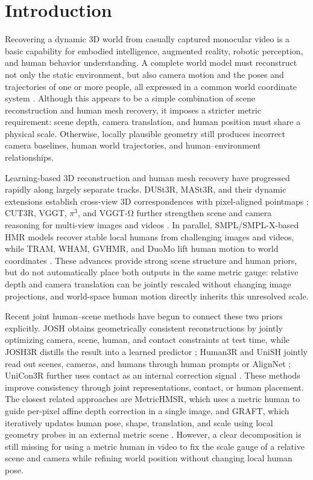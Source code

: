 \documentclass{article}
\begin{document}
\section{Introduction}\label{sec:introduction}

Recovering a dynamic 3D world from casually captured monocular video is a basic capability for embodied intelligence, augmented reality, robotic perception, and human behavior understanding. A complete world model must reconstruct not only the static environment, but also camera motion and the poses and trajectories of one or more people, all expressed in a common world coordinate system \citep{chen2026human3r,li2026unish,liu2026josh}. Although this appears to be a simple combination of scene reconstruction and human mesh recovery, it imposes a stricter metric requirement: scene depth, camera translation, and human position must share a physical scale. Otherwise, locally plausible geometry still produces incorrect camera baselines, human world trajectories, and human--environment relationships.

Learning-based 3D reconstruction and human mesh recovery have progressed rapidly along largely separate tracks. DUSt3R, MASt3R, and their dynamic extensions establish cross-view 3D correspondences with pixel-aligned pointmaps \citep{wang2024dust3r,leroy2024mast3r,zhang2024monst3r}; CUT3R, VGGT, $\pi^3$, and VGGT-Ω further strengthen scene and camera reasoning for multi-view images and videos \citep{wang2025cut3r,wang2025vggt,wang2025pi3,wang2026vggtomega}. In parallel, SMPL/SMPL-X-based HMR models recover stable local humans from challenging images and videos, while TRAM, WHAM, GVHMR, and DuoMo lift human motion to world coordinates \citep{wang2024tram,shin2024wham,shen2024gvhmr,wang2026duomo}. These advances provide strong scene structure and human priors, but do not automatically place both outputs in the same metric gauge: relative depth and camera translation can be jointly rescaled without changing image projections, and world-space human motion directly inherits this unresolved scale.

Recent joint human--scene methods have begun to connect these two priors explicitly. JOSH obtains geometrically consistent reconstructions by jointly optimizing camera, scene, human, and contact constraints at test time, while JOSH3R distills the result into a learned predictor \citep{liu2026josh}; Human3R and UniSH jointly read out scenes, cameras, and humans through human prompts or AlignNet \citep{chen2026human3r,li2026unish}; UniCon3R further uses contact as an internal correction signal \citep{sur2026unicon3r}. These methods improve consistency through joint representations, contact, or human placement. The closest related approaches are MetricHMSR, which uses a metric human to guide per-pixel affine depth correction in a single image, and GRAFT, which iteratively updates human pose, shape, translation, and scale using local geometry probes in an external metric scene \citep{song2026metrichmsr,ym2026graft}. However, a clear decomposition is still missing for using a metric human in video to fix the scale gauge of a relative scene and camera while refining world position without changing local human pose.
\end{document}
